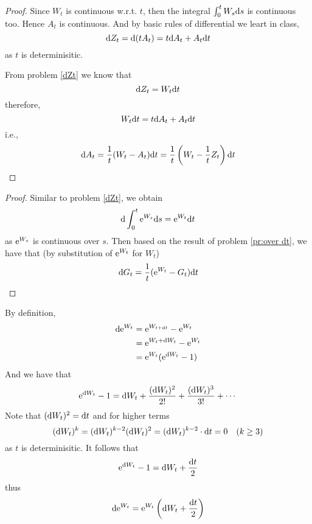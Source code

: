 \documentclass{homework}
\begin{document}
    \problem
    \label{pr:over dt}
    \begin{proof}
        Since $W_t$ is continuous w.r.t. $t$, then the
        integral $\int_0^tW_s\mathrm d s$ is continuous too.
        Hence $A_t$ is continuous. And by basic rules of
        differential we leart in class,
        \[\mathrm d Z_t=\mathrm d(tA_t)=t\mathrm d A_t+A_t\mathrm d t\]
        as $t$ is determinisitic.

        From problem \ref{dZt} we know that
        \[\mathrm d Z_t=W_t\mathrm d t\]
        therefore,
        \[W_t\mathrm d t=t\mathrm d A_t+A_t\mathrm d t\]
        i.e.,
        \[\mathrm d A_t=\frac{1}{t}(W_t-A_t)\mathrm d t
        =\frac{1}{t}\left(W_t-\frac{1}{t}Z_t\right)\mathrm d t\]
    \end{proof}

    \problem
    \begin{proof}
        Similar to problem \ref{dZt},
        we obtain
        \[\mathrm d\int_0^t\mathrm e^{W_s}\mathrm d s=\mathrm e^{W_t}\mathrm d t\]
        as $\mathrm e^{W_s}$ is continuous over $s$.
        Then based on the result of problem \ref{pr:over dt},
        we have that (by substitution of $\mathrm e^{W_t}$ for $W_t$)
        \[\mathrm d G_t=\frac1t(\mathrm e^{W_t}-G_t)\mathrm d t\]
    \end{proof}

    \problem
    By definition,
    \[\begin{aligned}
        \mathrm d\mathrm e^{W_t}&=\mathrm e^{W_{t+\mathrm d t}}-\mathrm e^{W_t}\\
        &=\mathrm e^{W_t+\mathrm d W_t}-\mathrm e^{W_t}\\
        &=\mathrm e^{W_t}(\mathrm e^{\mathrm d W_t}-1)
    \end{aligned}\]
    And we have that
    \[\mathrm e^{\mathrm d W_t}-1=\mathrm d W_t+\frac{(\mathrm d W_t)^2}{2!}
    +\frac{(\mathrm d W_t)^3}{3!}+\cdots\]
    Note that $(\mathrm d W_t)^2=\mathrm d t$ and for higher terms
    \begin{equation}
        \label{eq:high term 0}
        (\mathrm d W_t)^k=(\mathrm d W_t)^{k-2}(\mathrm d W_t)^2
        =(\mathrm d W_t)^{k-2}\cdot\mathrm d t=0\quad(k\geq 3)
    \end{equation}
    as $t$ is determinisitic. It follows that
    \[\mathrm e^{\mathrm d W_t}-1=\mathrm d W_t+\frac{\mathrm d t}{2}\]
    thus
    \[\mathrm d\mathrm e^{W_t}=\mathrm e^{W_t}\left(\mathrm d W_t+\frac{\mathrm d t}{2}\right)\]
\end{document}
